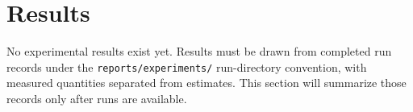 \section{Results}
No experimental results exist yet. Results must be drawn from completed run records under the \texttt{reports/experiments/} run-directory convention, with measured quantities separated from estimates. This section will summarize those records only after runs are available.

